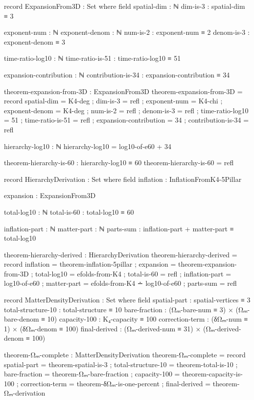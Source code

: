 \documentclass[11pt,a4paper]{book}
\begin{document}
\begin{code}
record ExpansionFrom3D : Set where
  field
    spatial-dim : ℕ
    dim-is-3 : spatial-dim ≡ 3
    
    exponent-num : ℕ
    exponent-denom : ℕ
    num-is-2 : exponent-num ≡ 2
    denom-is-3 : exponent-denom ≡ 3
    
    time-ratio-log10 : ℕ
    time-ratio-is-51 : time-ratio-log10 ≡ 51
    
    expansion-contribution : ℕ
    contribution-is-34 : expansion-contribution ≡ 34

theorem-expansion-from-3D : ExpansionFrom3D
theorem-expansion-from-3D = record
  { spatial-dim = K4-deg
  ; dim-is-3 = refl
  ; exponent-num = K4-chi
  ; exponent-denom = K4-deg
  ; num-is-2 = refl
  ; denom-is-3 = refl
  ; time-ratio-log10 = 51
  ; time-ratio-is-51 = refl
  ; expansion-contribution = 34
  ; contribution-is-34 = refl
  }

hierarchy-log10 : ℕ
hierarchy-log10 = log10-of-e60 + 34

theorem-hierarchy-is-60 : hierarchy-log10 ≡ 60
theorem-hierarchy-is-60 = refl

record HierarchyDerivation : Set where
  field
    inflation : InflationFromK4-5Pillar
    
    expansion : ExpansionFrom3D
    
    total-log10 : ℕ
    total-is-60 : total-log10 ≡ 60
    
    inflation-part : ℕ
    matter-part : ℕ
    parts-sum : inflation-part + matter-part ≡ total-log10

theorem-hierarchy-derived : HierarchyDerivation
theorem-hierarchy-derived = record
  { inflation = theorem-inflation-5pillar
  ; expansion = theorem-expansion-from-3D
  ; total-log10 = efolds-from-K4
  ; total-is-60 = refl
  ; inflation-part = log10-of-e60
  ; matter-part = efolds-from-K4 ∸ log10-of-e60
  ; parts-sum = refl
  }

record MatterDensityDerivation : Set where
  field
    spatial-part       : spatial-vertices ≡ 3
    total-structure-10 : total-structure ≡ 10
    bare-fraction      : (Ωₘ-bare-num ≡ 3) × (Ωₘ-bare-denom ≡ 10)
    capacity-100       : K₄-capacity ≡ 100
    correction-term    : (δΩₘ-num ≡ 1) × (δΩₘ-denom ≡ 100)
    final-derived      : (Ωₘ-derived-num ≡ 31) × (Ωₘ-derived-denom ≡ 100)

theorem-Ωₘ-complete : MatterDensityDerivation
theorem-Ωₘ-complete = record
  { spatial-part       = theorem-spatial-is-3
  ; total-structure-10 = theorem-total-is-10
  ; bare-fraction      = theorem-Ωₘ-bare-fraction
  ; capacity-100       = theorem-capacity-is-100
  ; correction-term    = theorem-δΩₘ-is-one-percent
  ; final-derived      = theorem-Ωₘ-derivation
  }


\end{code}
\end{document}
